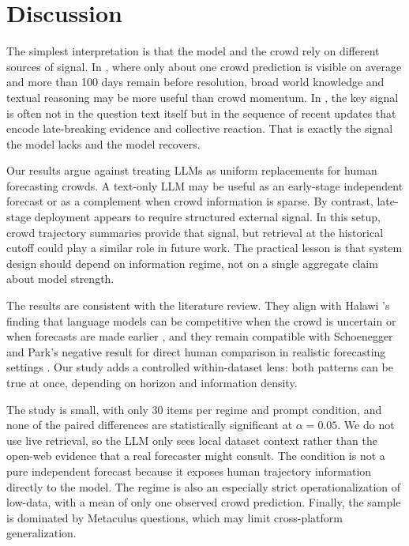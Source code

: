 \section{Discussion}
\label{sec:discussion}

 The simplest interpretation is that the model and the crowd rely on different sources of signal. In \longterm, where only about one crowd prediction is visible on average and more than 100 days remain before resolution, broad world knowledge and textual reasoning may be more useful than crowd momentum. In \shortterm, the key signal is often not in the question text itself but in the sequence of recent updates that encode late-breaking evidence and collective reaction. That is exactly the signal the \questiononly model lacks and the \withhistory model recovers.

 Our results argue against treating LLMs as uniform replacements for human forecasting crowds. A text-only LLM may be useful as an early-stage independent forecast or as a complement when crowd information is sparse. By contrast, late-stage deployment appears to require structured external signal. In this setup, crowd trajectory summaries provide that signal, but retrieval at the historical cutoff could play a similar role in future work. The practical lesson is that system design should depend on information regime, not on a single aggregate claim about model strength.

 The results are consistent with the literature review. They align with Halawi \etal's finding that language models can be competitive when the crowd is uncertain or when forecasts are made earlier \cite{halawi2024approaching}, and they remain compatible with Schoenegger and Park's negative result for direct human comparison in realistic forecasting settings \cite{schoenegger2023llm}. Our study adds a controlled within-dataset lens: both patterns can be true at once, depending on horizon and information density.

 The study is small, with only 30 items per regime and prompt condition, and none of the paired differences are statistically significant at $\alpha=0.05$. We do not use live retrieval, so the LLM only sees local dataset context rather than the open-web evidence that a real forecaster might consult. The \withhistory condition is not a pure independent forecast because it exposes human trajectory information directly to the model. The \longterm regime is also an especially strict operationalization of low-data, with a mean of only one observed crowd prediction. Finally, the \shortterm sample is dominated by Metaculus questions, which may limit cross-platform generalization.


